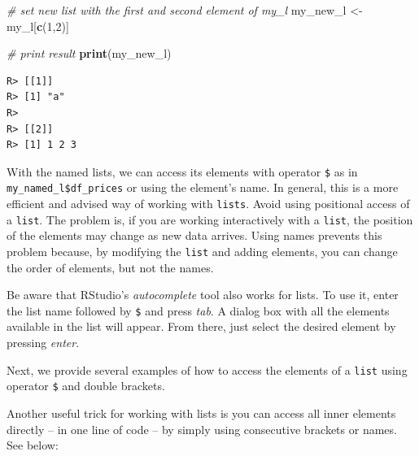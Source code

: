 \documentclass[
  12pt,
]{book}
\newenvironment{Shaded}{\begin{snugshade}}{\end{snugshade}}
\newcommand{\CommentTok}[1]{\textcolor[rgb]{0.37,0.37,0.37}{\textit{#1}}}
\newcommand{\DecValTok}[1]{\textcolor[rgb]{0.06,0.06,0.06}{#1}}
\newcommand{\KeywordTok}[1]{\textcolor[rgb]{0.27,0.27,0.27}{\textbf{#1}}}
\newcommand{\NormalTok}[1]{#1}
\newcommand{\OperatorTok}[1]{\textcolor[rgb]{0.43,0.43,0.43}{\textbf{#1}}}
\newcommand{\StringTok}[1]{\textcolor[rgb]{0.5,0.5,0.5}{#1}}
\newenvironment{rmdimportant}
{\begin{importantblock}
		
	} {\end{importantblock}}
\begin{document}
\begin{Shaded}
\begin{Highlighting}[]
\CommentTok{# set new list with the first and second element of my_l}
\NormalTok{my_new_l <-}\StringTok{ }\NormalTok{my_l[}\KeywordTok{c}\NormalTok{(}\DecValTok{1}\NormalTok{,}\DecValTok{2}\NormalTok{)]}

\CommentTok{# print result}
\KeywordTok{print}\NormalTok{(my_new_l)}
\end{Highlighting}
\end{Shaded}

\begin{verbatim}
R> [[1]]
R> [1] "a"
R> 
R> [[2]]
R> [1] 1 2 3
\end{verbatim}

With the named lists, we can access its elements with operator \texttt{\$} as in \texttt{my\_named\_l\$df\_prices} or using the element's name. In general, this is a more efficient and advised way of working with \texttt{lists}. Avoid using positional access of a \texttt{list}. The problem is, if you are working interactively with a \texttt{list}, the position of the elements may change as new data arrives. Using names prevents this problem because, by modifying the \texttt{list} and adding elements, you can change the order of elements, but not the names.

\begin{rmdimportant}
Be aware that RStudio's \emph{autocomplete} tool also works for lists.
To use it, enter the list name followed by \texttt{\$} and press
\emph{tab}. A dialog box with all the elements available in the list
will appear. From there, just select the desired element by pressing
\emph{enter}.
\end{rmdimportant}

Next, we provide several examples of how to access the elements of a \texttt{list} using operator \texttt{\$} and double brackets.

\begin{Shaded}
\end{Shaded}

Another useful trick for working with lists is you can access all inner elements directly -- in one line of code -- by simply using consecutive brackets or names. See below:
\end{document}
